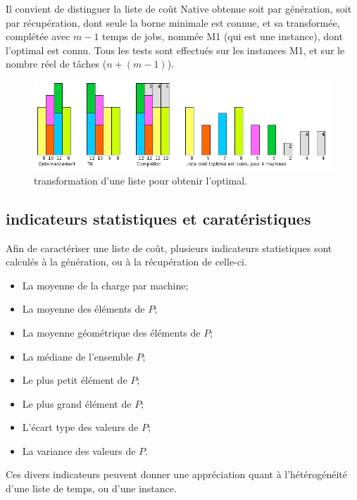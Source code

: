 \documentclass[a4paper,12pt]{report}
\theoremstyle{plain}				%
\theoremstyle{definition}				%
\begin{document}
\bigskip 
Il convient de distinguer la liste de coût Native obtenue 
  soit par génération, 
  soit par récupération, 
  dont seule la borne minimale est connue, 
  et sa transformée, complétée avec $m-1$ temps de jobs, nommée M1 (qui est une instance), 
  dont l'optimal est connu.
Tous les tests sont effectués sur les instances M1, 
  et sur le nombre réel de tâches ($n + (m-1)$).

\begin{figure}
{\centering
\includegraphics[width=\columnwidth]{maitriseOptimal.jpg}
\caption{transformation d'une liste pour obtenir l'optimal.}
\label{ex:maitriseOptimal}
\par}
\end{figure}

\subsection{indicateurs statistiques et caratéristiques}\label{ssec:instancesIndicateursStatistiquesCaratéristiques}

Afin de caractériser une liste de coût, plusieurs indicateurs statistiques sont calculés à la génération, ou à la récupération de celle-ci.

\begin{itemize}
	\item La moyenne de la charge par machine;
	\item La moyenne des éléments de $P$;
	\item La moyenne géométrique des éléments de $P$;
	\item La médiane de l'ensemble $P$;
	\item Le plus petit élément de $P$;
	\item Le plus grand élément de $P$;
	\item L'écart type des valeurs de $P$;
	\item La variance des valeurs de $P$.
\end{itemize}

Ces divers indicateurs peuvent donner une appréciation quant à 
  l'hétérogénéité d'une liste de temps, ou d'une instance.
\end{document}
